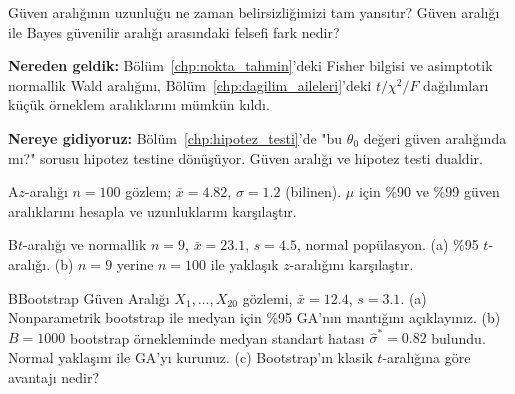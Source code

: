 \begin{ozyansima}
Güven aralığının uzunluğu ne zaman belirsizliğimizi tam yansıtır? Güven aralığı ile Bayes güvenilir aralığı arasındaki felsefi fark nedir?
\end{ozyansima}

\begin{kopru}
\textbf{Nereden geldik:} Bölüm~\ref{chp:nokta_tahmin}'deki Fisher bilgisi ve asimptotik normallik Wald aralığını, Bölüm~\ref{chp:dagilim_aileleri}'deki $t/\chi^2/F$ dağılımları küçük örneklem aralıklarını mümkün kıldı.

\textbf{Nereye gidiyoruz:} Bölüm~\ref{chp:hipotez_testi}'de "bu $\theta_0$ değeri güven aralığında mı?" sorusu hipotez testine dönüşüyor. Güven aralığı ve hipotez testi dualdir.
\end{kopru}


\cozumlualistirmalar

\begin{alistirma}[Al.13.1]{A}{$z$-aralığı}
$n=100$ gözlem; $\bar{x}=4.82$, $\sigma=1.2$ (bilinen). $\mu$ için \%90 ve \%99 güven aralıklarını hesapla ve uzunluklarını karşılaştır.
\end{alistirma}

\begin{alistirma}[Al.13.2]{B}{$t$-aralığı ve normallik}
$n=9$, $\bar{x}=23.1$, $s=4.5$, normal popülasyon. (a) \%95 $t$-aralığı. (b) $n=9$ yerine $n=100$ ile yaklaşık $z$-aralığını karşılaştır.
\end{alistirma}

\begin{alistirma}[Al.13.2b]{B}{Bootstrap Güven Aralığı}
$X_1,\ldots,X_{20}$ gözlemi, $\bar{x}=12.4$, $s=3.1$. (a) Nonparametrik bootstrap ile medyan için \%95 GA'nın mantığını açıklayınız. (b) $B=1000$ bootstrap örnekleminde medyan standart hatası $\hat\sigma^*=0.82$ bulundu. Normal yaklaşım ile GA'yı kurunuz. (c) Bootstrap'ın klasik $t$-aralığına göre avantajı nedir?
\end{alistirma}

